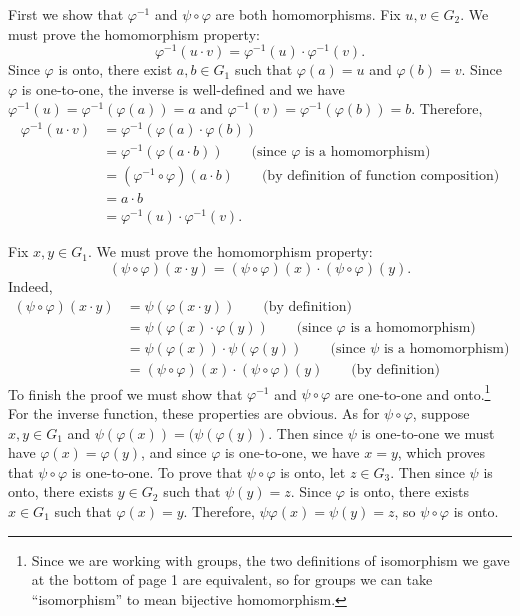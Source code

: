 \documentclass[12pt,reqno]{amsart}
\newcommand{\<}{\ensuremath{\langle}}
\renewcommand{\>}{\ensuremath{\rangle}}
\renewcommand{\phi}{\ensuremath{\varphi}}
\begin{document}
\begin{enumerate}[{\bf 1.}]
\medskip
{} First we show that $\phi^{-1}$ and $\psi\circ \phi$
are both homomorphisms.
Fix $u, v \in G_2$.  We must prove the homomorphism property:
\begin{equation}
  \label{eq:1}
\phi^{-1}(u \cdot v) = \phi^{-1}(u) \cdot \phi^{-1}(v).
\end{equation}
Since $\phi$ is onto, there exist $a, b\in G_1$ such that $\phi(a) = u$ and
$\phi(b) = v$.  Since $\phi$ is one-to-one, the inverse is well-defined and we
have $\phi^{-1}(u) = \phi^{-1}(\phi(a)) =a$ and 
$\phi^{-1}(v) = \phi^{-1}(\phi(b)) = b$.  Therefore,
\begin{align*}
\phi^{-1}(u  \cdot v) &= \phi^{-1}(\phi(a) \cdot  \phi(b))\\
&= \phi^{-1}(\phi(a \cdot  b)) \qquad \text{(since $\phi$ is a homomorphism)}\\
&= (\phi^{-1}\circ\phi)(a \cdot  b)\qquad \text{(by definition of function composition)}\\
&= a \cdot  b\\
&= \phi^{-1}(u) \cdot \phi^{-1}(v).
\end{align*}

Fix $x, y \in G_1$. We must prove the homomorphism property:
\begin{equation}
  \label{eq:2}
(\psi\circ \phi)(x\cdot y) =(\psi\circ \phi)(x)\cdot (\psi\circ \phi)(y).
\end{equation}
Indeed,
\begin{align*}
(\psi\circ \phi)(x\cdot y) &=\psi(\phi(x\cdot y)) \qquad \text{(by definition)}\\
&=\psi(\phi(x)\cdot \phi(y)) \qquad \text{(since $\phi$ is a homomorphism)}\\
&=\psi(\phi(x))\cdot \psi(\phi(y)) \qquad \text{(since $\psi$ is a homomorphism)}\\
&=(\psi\circ \phi)(x) \cdot (\psi\circ \phi)(y) \qquad \text{(by definition)}
\end{align*}
To finish the proof we must
show that $\phi^{-1}$ and $\psi\circ \phi$ 
are one-to-one and onto.\footnote{Since we are working with groups, the two
  definitions of isomorphism we gave at the bottom of page 1 are
  equivalent, so for groups we can take ``isomorphism'' to mean bijective
  homomorphism.} 
For the inverse function, these properties are obvious.  
As for $\psi \circ \phi$, suppose $x, y\in G_1$ and 
 $\psi(\phi (x)) =  (\psi(\phi(y))$. Then since $\psi$ is one-to-one we must
have $\phi(x)=\phi(y)$, and since $\phi$ is one-to-one, we have $x=y$, which
proves that $\psi\circ\phi$ is one-to-one.
To prove that $\psi\circ\phi$ is onto, let $z \in G_3$.  
Then since $\psi$ is onto, there exists $y\in G_2$ such that $\psi(y) = z$.
Since $\phi$ is onto, there exists $x\in G_1$ such that $\phi(x) = y$.
Therefore, $\psi\phi(x) = \psi(y) = z$, so 
$\psi\circ\phi$ is onto.

\end{enumerate}
\end{document}
